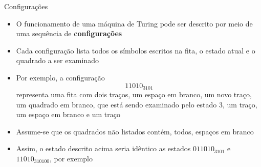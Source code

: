 \begin{frame}[fragile]{Configurações}

    \begin{itemize}
        \item O funcionamento de uma máquina de Turing pode ser descrito por meio de uma
            sequência de \textbf{configurações}

        \item Cada configuração lista todos os símbolos escritos na fita, o estado atual e 
            o quadrado a ser examinado

        \item Por exemplo, a configuração
        \[
            11010_3101
        \]
        representa uma fita com dois traços, um espaço em branco, um novo traço, um quadrado
        em branco, que está sendo examinado pelo estado $3$, um traço, um espaço em branco e 
        um traço

        \item Assume-se que os quadrados não listados contém, todos, espaços em branco

        \item Assim, o estado descrito acima seria idêntico as estados
            $011010_3101$ e $11010_310100$, por exemplo
    \end{itemize}

\end{frame}
